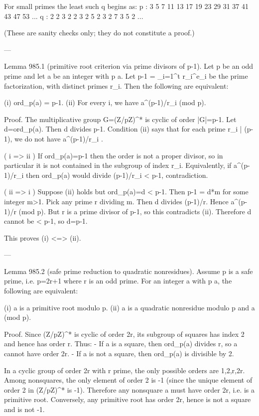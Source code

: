 For small primes the least such q begins as:
  p :  3  5  7 11 13 17 19 23 29 31 37 41 43 47 53 ...
  q :  2  2  3  2  2  3  2  5  2  3  2  7  3  5  2 ...

(These are sanity checks only; they do not constitute a proof.)

---

Lemma 985.1 (primitive root criterion via prime divisors of p-1).
Let p be an odd prime and let a be an integer with p \nmid a. Let p-1 = \prod_{i=1}^t r_i^{e_i}
be the prime factorization, with distinct primes r_i. Then the following are equivalent:

  (i) ord_p(a) = p-1.
  (ii) For every i, we have a^{(p-1)/r_i} \not{} (mod p).

Proof.
The multiplicative group G=(Z/pZ)^* is cyclic of order |G|=p-1.
Let d=ord_p(a). Then d divides p-1. Condition (ii) says that for each prime r_i | (p-1),
we do not have a^{(p-1)/r_i} .

( i => ii ) If ord_p(a)=p-1 then the order is not a proper divisor, so in particular it is not
contained in the subgroup of index r_i. Equivalently, if a^{(p-1)/r_i} then ord_p(a)
would divide (p-1)/r_i < p-1, contradiction.

( ii => i ) Suppose (ii) holds but ord_p(a)=d < p-1. Then p-1 = d*m for some integer m>1.
Pick any prime r dividing m. Then d divides (p-1)/r. Hence a^{(p-1)/r}  (mod p).
But r is a prime divisor of p-1, so this contradicts (ii).
Therefore d cannot be < p-1, so d=p-1.

This proves (i) <=> (ii).

---

Lemma 985.2 (safe prime reduction to quadratic nonresidues).
Assume p is a safe prime, i.e. p=2r+1 where r is an odd prime.
For an integer a with p \nmid a, the following are equivalent:

  (i) a is a primitive root modulo p.
  (ii) a is a quadratic nonresidue modulo p and a \not{} (mod p).

Proof.
Since (Z/pZ)^* is cyclic of order 2r, its subgroup of squares has index 2 and hence has
order r. Thus:
- If a is a square, then ord_p(a) divides r, so a cannot have order 2r.
- If a is not a square, then ord_p(a) is divisible by 2.

In a cyclic group of order 2r with r prime, the only possible orders are 1,2,r,2r.
Among nonsquares, the only element of order 2 is -1 (since the unique element of order 2
in (Z/pZ)^* is -1). Therefore any nonsquare a \not{} must have order 2r, i.e. is a
primitive root.
Conversely, any primitive root has order 2r, hence is not a square and is not -1.

